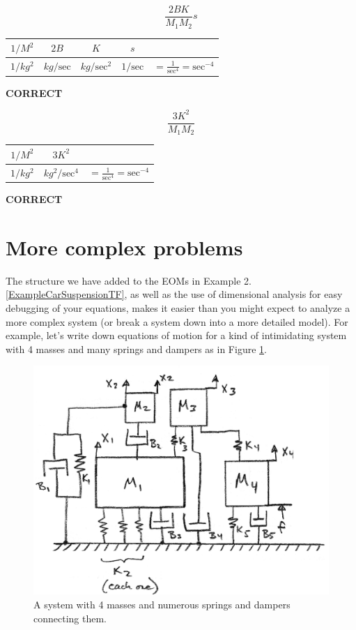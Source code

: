 \begin{Example}
\[
\frac{2BK}{M_1M_2}s
\]


\begin{tabular}{c|c|c|c|c}
$1/M^2$	  & $2B$		& $K$	& $s$ & \\ \hline
$1/kg^2$  & $kg/\mathrm{sec}$	& $kg/\mathrm{sec}^2$	& $1/\mathrm{sec}$	& $= \frac{1}{\mathrm{sec}^4} = \mathrm{sec}^{-4}$
\end{tabular}
\hspace{0.25in}  {\bf CORRECT}



\[
\frac{3K^2}{M_1M_2}
\]

\begin{tabular}{c|c|c}
$1/M^2$	& $3K^2$   & \\ \hline
$1/kg^2$  & $kg^2/\mathrm{sec}^4$	& $= \frac{1}{\mathrm{sec}^4} = \mathrm{sec}^{-4}$
\end{tabular}\hspace{0.25in}  {\bf CORRECT}

\end{Example}

\section{More complex problems}
The structure we have added to the EOMs in Example 2.\ref{ExampleCarSuspensionTF}, as well as the
use of dimensional analysis for easy debugging of your equations, makes it easier than you
might expect to analyze a more complex system (or break a system down into a more detailed model).
For example, let's write down equations of motion for a kind of intimidating
system with 4 masses and many springs and
dampers as in Figure \ref{complexDynSystem}.


\begin{figure}\centering
\includegraphics[width=120mm]{figs02/00933a.png}
\caption{A system with 4 masses and numerous springs and dampers connecting them.}
\label{complexDynSystem}
\end{figure}

